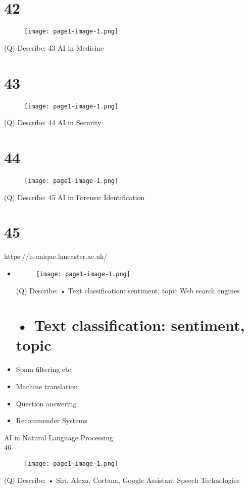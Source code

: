 \documentclass[12pt]{article}
\begin{document}
\section{42}
\begin{figure}[H]
\texttt{[image: page1-image-1.png]}
\end{figure}
\clearpage
(Q)
Describe: 43
\clearpage
AI in Medicine\\
\section{43}
\begin{figure}[H]
\texttt{[image: page1-image-1.png]}
\end{figure}
\clearpage
(Q)
Describe: 44
\clearpage
AI in Security\\
\section{44}
\begin{figure}[H]
\texttt{[image: page1-image-1.png]}
\end{figure}
\clearpage
(Q)
Describe: 45
\clearpage
AI in Forensic Identification\\
\section{45}
https://h-unique.lancaster.ac.uk/\\
\begin{itemize}
  \item \begin{figure}[H]
\texttt{[image: page1-image-1.png]}
\end{figure}
\clearpage
(Q)
Describe: • Text classification: sentiment, topic
\clearpage
Web search engines
\section{• Text classification: sentiment, topic}
  \item Spam filtering etc
  \item Machine translation
  \item Question answering
  \item Recommender Systems
\end{itemize}
AI in Natural Language Processing\\
46\\
\begin{figure}[H]
\texttt{[image: page1-image-1.png]}
\end{figure}
\clearpage
(Q)
Describe: • Siri, Alexa, Cortana, Google Assistant
\clearpage
Speech Technologies\\
\end{document}
